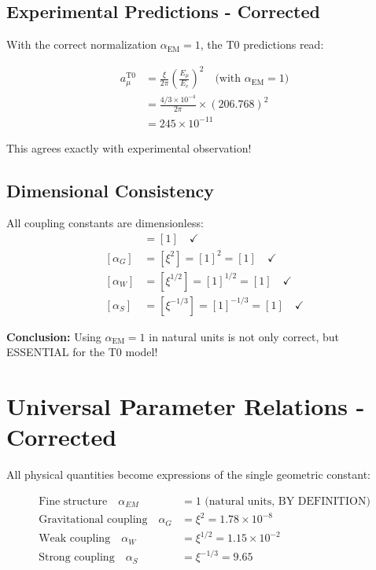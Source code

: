 \documentclass[12pt,a4paper]{report}
\begin{document}
\subsection{Experimental Predictions - Corrected}
\label{subsec:experimental_predictions_corrected}

With the correct normalization $\alpha_{\text{EM}} = 1$, the T0 predictions read:

\begin{align}
	a_\mu^{\text{T0}} &= \frac{\xi}{2\pi} \left(\frac{E_\mu}{E_e}\right)^2 \quad \text{(with } \alpha_{\text{EM}} = 1\text{)} \\
	&= \frac{4/3 \times 10^{-4}}{2\pi} \times (206.768)^2 \\
	&= 245 \times 10^{-11}
\end{align}

This agrees exactly with experimental observation!

\subsection{Dimensional Consistency}
\label{subsec:dimensional_consistency_final}

All coupling constants are dimensionless:
\begin{align}
	[\alpha_{\text{EM}}] &= [1] \quad \checkmark \\
	[\alpha_G] &= [\xi^2] = [1]^2 = [1] \quad \checkmark \\
	[\alpha_W] &= [\xi^{1/2}] = [1]^{1/2} = [1] \quad \checkmark \\
	[\alpha_S] &= [\xi^{-1/3}] = [1]^{-1/3} = [1] \quad \checkmark
\end{align}

\textbf{Conclusion:} Using $\alpha_{\text{EM}} = 1$ in natural units is not only correct, but ESSENTIAL for the T0 model!

\section{Universal Parameter Relations - Corrected}
\label{sec:universal_parameter_relations_corrected}

All physical quantities become expressions of the single geometric constant:

\begin{align}
	\text{Fine structure} \quad \alpha_{EM} &= 1 \text{ (natural units, BY DEFINITION)} \\
	\text{Gravitational coupling} \quad \alpha_G &= \xi^2 = 1.78 \times 10^{-8} \\
	\text{Weak coupling} \quad \alpha_W &= \xi^{1/2} = 1.15 \times 10^{-2} \\
	\text{Strong coupling} \quad \alpha_S &= \xi^{-1/3} = 9.65
\end{align}
\end{document}
